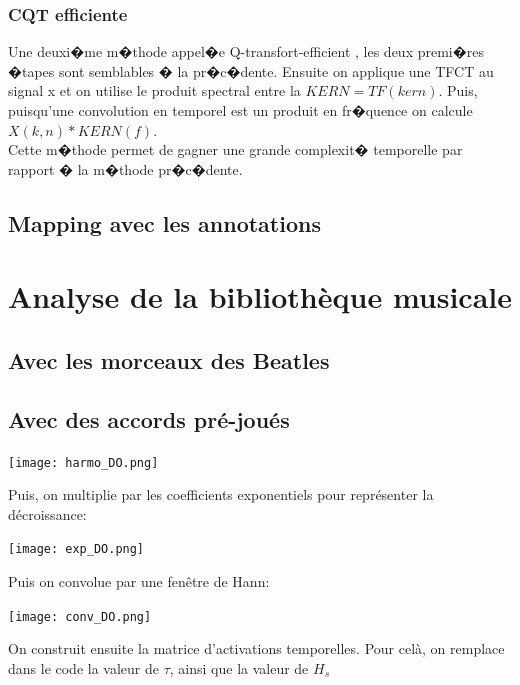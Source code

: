 \documentclass[12pt,a4paper]{article}
\begin{document}
\subsubsection{CQT efficiente}
Une deuxi�me m�thode appel�e Q-transfort-efficient , les deux premi�res �tapes sont semblables � la pr�c�dente. Ensuite on applique une TFCT au signal x et on utilise le produit spectral entre la $KERN = TF(kern)$. Puis, puisqu'une convolution en temporel est un produit en fr�quence on calcule $X(k,n)*KERN(f)$.\\
Cette m�thode permet de gagner une grande complexit� temporelle par rapport � la m�thode pr�c�dente.

\subsection{Mapping avec les annotations}

\section{Analyse de la bibliothèque musicale}
\subsection{Avec les morceaux des Beatles}
\subsection{Avec des accords pré-joués}


\begin{center}
\texttt{[image: harmo\_DO.png]}
\end{center}

Puis, on multiplie par les coefficients exponentiels pour représenter la décroissance:

\begin{center}
\texttt{[image: exp\_DO.png]}
\end{center}

Puis on convolue par une fenêtre de Hann:

\begin{center}
\texttt{[image: conv\_DO.png]}
\end{center}

On construit ensuite la matrice d'activations temporelles. Pour celà, on remplace dans le code la valeur de $\tau$, ainsi que la valeur de $H_s$
\end{document}
